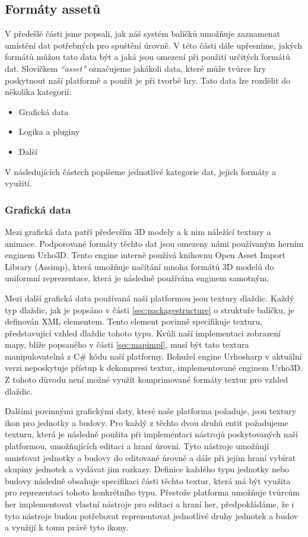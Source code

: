 \subsection{Formáty assetů}
V předešlé části jsme popsali, jak náš systém balíčků umožňuje zaznamenat umístění dat potřebných pro spuštění úrovně. V této části dále upřesníme, jakých formátů můžou tato data být a jaká jsou omezení při použití určitých formátů dat. Slovíčkem \textit{``asset''} označujeme jakákoli data, které může tvůrce hry poskytnout naší platformě a použít je při tvorbě hry. Tato data lze rozdělit do několika kategorií:
\begin{itemize}
	\item Grafická data
	\item Logika a pluginy
	\item Další
\end{itemize}

V následujících částech popíšeme jednotlivé kategorie dat, jejich formáty a využití.

\subsubsection{Grafická data}
Mezi grafická data patří především 3D modely a k nim náležící textury a animace. Podporované formáty těchto dat jsou omezeny námi používaným herním enginem Urho3D. Tento engine interně používá knihovnu Open Asset Import Library (Assimp)\citep{site:assimp}, která umožňuje načítání mnoha formátů 3D modelů do uniformní reprezentace, která je následně používána enginem samotným.

Mezi další grafická data používaná naší platformou jsou textury dlaždic. Každý typ dlaždic, jak je popsáno v části \ref{sec:packagestructure} o struktuře balíčku, je definován XML elementem. Tento element povinně specifikuje texturu, představující vzhled dlaždic tohoto typu. Kvůli naší implementaci zobrazení mapy, blíže popsaného v části \ref{sec:mapimpl}, musí být tato textura manipulovatelná z C\# kódu naší platformy. Bohužel engine Urhosharp v aktuální verzi neposkytuje přístup k dekompresi textur, implementované enginem Urho3D. Z tohoto důvodu není možné využít komprimované formáty textur pro vzhled dlaždic.

Dalšími povinnými grafickými daty, které naše platforma požaduje, jsou textury ikon pro jednotky a budovy. Pro každý z těchto dvou druhů entit požadujeme texturu, která je následně použita při implementaci nástrojů  poskytovaných naší platformou, umožňujících editaci a hraní úrovní. Tyto nástroje umožňují umisťovat jednotky a budovy do editované úrovně a dále při jejím hraní vybírat skupiny jednotek a vydávat jim rozkazy. Definice každého typu jednotky nebo budovy následně obsahuje specifikaci části těchto textur, která má být využita pro reprezentaci tohoto konkrétního typu. Přestože platforma umožňuje tvůrcům her implementovat vlastní nástroje pro editaci a hraní her, předpokládáme, že i tyto nástroje budou potřebovat reprezentovat jednotlivé druhy jednotek a budov a využijí k tomu právě tyto ikony.


